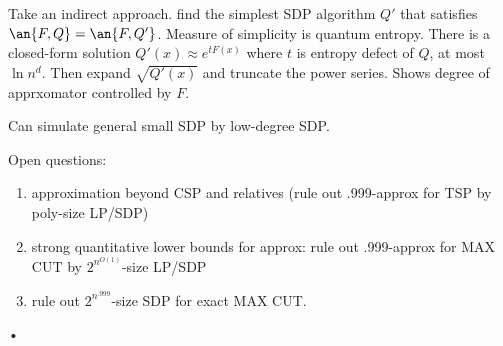 Take an indirect approach. find the simplest SDP algorithm $Q'$ that satisfies $\an{F,Q}=\an{F,Q'}$. Measure of simplicity is quantum entropy. There is a closed-form solution $Q'(x)\approx e^{tF(x)}$ where $t$ is entropy defect of $Q$, at most $\ln n^d$. Then expand $\sqrt{Q'(x)}$ and truncate the power series. Shows degree of apprxomator controlled by $F$.

Can simulate general small SDP by low-degree SDP.

Open questions:
\begin{enumerate}
\item
approximation beyond CSP and relatives (rule out .999-approx for TSP by poly-size LP/SDP)
\item
strong quantitative lower bounds for approx: rule out .999-approx for MAX CUT by $2^{n^{O(1)}}$-size LP/SDP
\item
rule out $2^{n^{.999}}$-size SDP for exact MAX CUT.

\end{enumerate}•